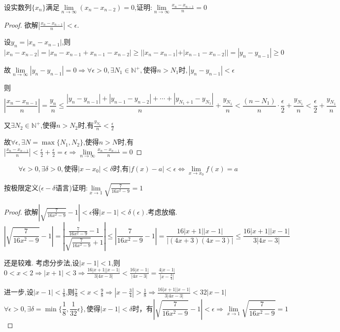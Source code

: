 \begin{example}
    设实数列$\{x_n\}$满足$\lim\limits_{n\to \infty}(x_n-x_{n-2})=0$,证明:$\lim\limits_{n\to \infty}\frac{x_n-x_{n-1}}{n}=0$
\end{example}

\begin{proof}
    
    欲解$|\frac{x_n-x_{n-1}}{n}|<\epsilon$. 

    设$y_n=|x_n-x_{n-1}|$,则$|x_n-x_{n-2}|=|x_n-x_{n-1}+x_{n-1}-x_{n-2}|\ge ||x_n-x_{n-1}|+|x_{n-1}-x_{n-2}||=|y_n-y_{n-1}|\ge 0$

    故$\lim\limits_{n\to \infty}|y_n-y_{n-1}|=0
    \Longrightarrow \forall \epsilon>0,\exists N_1\in \mathbb{N}^+,\mbox{使得}n>N_1\mbox{时},|y_n-y_{n-1}|<\epsilon$

    则$$|\frac{x_n-x_{n-1}}{n}|=\frac{y_n}{n}\le
    \frac{|y_n-y_{n-1}|+|y_{n-1}-y_{n-2}|+\cdots +|y_{N_1+1}-y_{N_1}|}{n}+\frac{y_{N_1}}{n}<\frac{(n-N_1)}{n}\cdot \frac{\epsilon}{2}+\frac{y_{N_1}}{n}<\frac{\epsilon}{2}+\frac{y_{N_1}}{n}$$

    又$\exists N_2\in \mathbb{N}^+$,使得$n>N_2$时,有$\frac{y_{N_1}}{n}<\frac{\epsilon}{2}$

    故$\forall \epsilon,\exists N=\max \{N_1,N_2\}$,使得$n>N$时,有$|\frac{x_n-x_{n-1}}{n}|<\frac{\epsilon}{2}+\frac{\epsilon}{2}=\epsilon\Longrightarrow \lim\limits_{n\to \infty}\frac{x_n-x_{n-1}}{n}=0$
\end{proof}

\begin{definition}
    \begin{equation*}
        \forall \epsilon>0,\exists \delta>0,\mbox{使得}|x-x_0|<\delta\mbox{时,有}|f(x)-a|<\epsilon\Longleftrightarrow \lim\limits_{x\to x_0} f(x)=a
    \end{equation*}
\end{definition}

\begin{example}
    按极限定义($\epsilon-\delta$语言)证明:$\lim\limits_{x\to 1}\sqrt{\frac{7}{16x^2-9}}=1$
\end{example}

\begin{proof}
    欲解$|\sqrt{\frac{7}{16x^2-9}}-1|<\epsilon$得$|x-1|<\delta(\epsilon)$.考虑放缩. 
    $$|\sqrt{\frac{7}{16x^2-9}}-1|=|\frac{\frac{7}{16x^2-9}-1}{\sqrt{\frac{7}{16x^2-9}}+1}|\le |\frac{7}{16x^2-9}-1|=\frac{16|x+1||x-1|}{|(4x+3)(4x-3)|}\le \frac{16|x+1||x-1|}{3|4x-3|}$$

    还是较难. 考虑分步法,设$|x-1|<1$,则$0<x<2\Longrightarrow |x+1|<3\Longrightarrow \frac{16|x+1||x-1|}{3|4x-3|}<\frac{16|x-1|}{|4x-3|}=\frac{4|x-1|}{|x-\frac{3}{4}|}$

    进一步,设$|x-1|<\frac{1}{8}$,则$\frac{7}{8}<x<\frac{9}{8}\Longrightarrow |x-\frac{3}{4}|>\frac{1}{8}\Longrightarrow \frac{16|x+1||x-1|}{3|4x-3|}<32|x-1|$
    $$\forall \epsilon>0,\exists \delta=\min \{\frac{1}{8},\frac{1}{32}\epsilon\},\mbox{使得}|x-1|<\delta\mbox{时，有}|\sqrt{\frac{7}{16x^2-9}}-1|<\epsilon\Longrightarrow \lim\limits_{x\to 1}\sqrt{\frac{7}{16x^2-9}}=1$$
\end{proof}